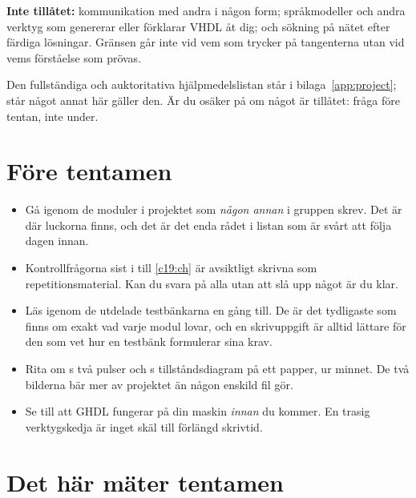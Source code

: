 \textbf{Inte tillåtet:} kommunikation med andra i någon form; språkmodeller och andra verktyg som
genererar eller förklarar VHDL åt dig; och sökning på nätet efter färdiga lösningar. Gränsen går
inte vid vem som trycker på tangenterna utan vid vems förståelse som prövas.

Den fullständiga och auktoritativa hjälpmedelslistan står i bilaga~\ref{app:project}; står något
annat här gäller den. Är du osäker på om något är tillåtet: fråga före tentan, inte under.

\section{Före tentamen}
\label{c20:sec:prep}

\begin{itemize}
  \item Gå igenom de moduler i projektet som \emph{någon annan} i gruppen skrev. Det är där luckorna
    finns, och det är det enda rådet i listan som är svårt att följa dagen innan.
  \item Kontrollfrågorna sist i  till \ref{c19:ch} är avsiktligt skrivna som
    repetitionsmaterial. Kan du svara på alla utan att slå upp något är du klar.
  \item Läs igenom de utdelade testbänkarna en gång till. De är det tydligaste som finns om exakt
    vad varje modul lovar, och en skrivuppgift är alltid lättare för den som vet hur en testbänk
    formulerar sina krav.
  \item Rita om s två pulser och s tillståndsdiagram på ett
    papper, ur minnet. De två bilderna bär mer av projektet än någon enskild fil gör.
  \item Se till att GHDL fungerar på din maskin \emph{innan} du kommer. En trasig verktygskedja är
    inget skäl till förlängd skrivtid.
\end{itemize}

\section{Det här mäter tentamen}
\label{c20:sec:measures}

